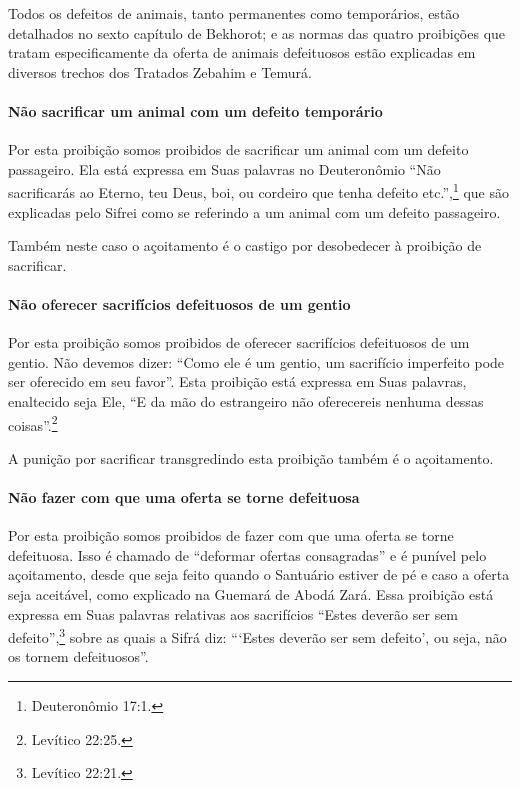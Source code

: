Todos os defeitos de animais, tanto permanentes como temporários, estão
detalhados no sexto capítulo de Bekhorot; e as normas das quatro
proibições que tratam especificamente da oferta de animais defeituosos
estão explicadas em diversos trechos dos Tratados Zebahim e Temurá.

\paragraph{Não sacrificar um animal com um defeito temporário}

Por esta proibição somos proibidos de sacrificar um animal com um
defeito passageiro. Ela está expressa em Suas palavras no Deuteronômio
``Não sacrificarás ao Eterno, teu Deus, boi, ou cordeiro que tenha
defeito etc.'',\footnote{Deuteronômio 17:1.} que são explicadas pelo Sifrei
como se referindo a um animal com um defeito passageiro.

Também neste caso o açoitamento é o castigo por desobedecer à proibição
de sacrificar.


\paragraph{Não oferecer sacrifícios defeituosos de um gentio}

Por esta proibição somos proibidos de oferecer sacrifícios defeituosos
de um gentio. Não devemos dizer: ``Como ele é um gentio, um sacrifício
imperfeito pode ser oferecido em seu favor''. Esta proibição está
expressa em Suas palavras, enaltecido seja Ele, ``E da mão do
estrangeiro não oferecereis nenhuma dessas coisas''.\footnote{Levítico 22:25.}

A punição por sacrificar transgredindo esta proibição também é o
açoitamento.

\paragraph{Não fazer com que uma oferta se torne defeituosa}

Por esta proibição somos proibidos de fazer com que uma oferta se torne
defeituosa. Isso é chamado de ``deformar ofertas consagradas'' e é
punível pelo açoitamento, desde que seja feito quando o Santuário
estiver de pé e caso a oferta seja aceitável, como explicado na Guemará
de Abodá Zará. Essa proibição está expressa em Suas palavras relativas
aos sacrifícios ``Estes deverão ser sem defeito'',\footnote{Levítico 22:21.}
sobre as quais a Sifrá diz: ```Estes deverão ser sem defeito', ou seja,
não os tornem defeituosos''.

